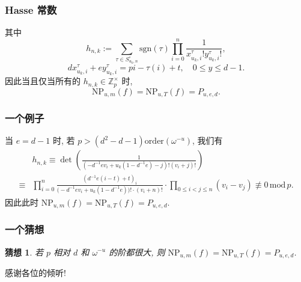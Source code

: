 \documentclass{beamer}
\newcommand\BZ{{\mathbb{Z}}}
\renewcommand\mod{\, \mathrm{mod}\, }
\newcommand\NP{{\mathrm{NP}}}
\newcommand\sgn{{\mathrm{sgn}}}
\newtheorem{conjecture}{猜想}[section]
\begin{document}
\begin{frame}
\frametitle{Hasse 常数}
其中
	\[
	h_{n,k}:=\sum_{\tau\in S_{u_k,n}^\circ}\sgn(\tau)\prod_{i=0}^n\frac{1}{x_{u_k,i}^\tau!y_{u_k,i}^\tau!},
	\]
	\[dx_{u_k,i}^\tau+ey_{u_k,i}^\tau=pi-\tau(i)+t,\quad 0\le y\le d-1.\]
因此当且仅当所有的 $h_{n,k}\in\BZ_p^\times$ 时,
	\[\NP_{u,m}(f)=\NP_{u,T}(f)=P_{u,e,d}.\]
\end{frame}


\begin{frame}
\frametitle{一个例子}
当 $e=d-1$ 时, 若 $p>(d^2-d-1)\mathrm{order}(\omega^{-u})$, 我们有
	\[\begin{split}
	&h_{n,k}\equiv\det\left(\frac{1}{(-d^{-1}ev_i+u_k(1-d^{-1}e)-j)!(v_i+j)!}\right)\\
\equiv &\prod_{i=0}^n \frac{\left(d^{-1}e(i-t)+t\right)_i}{\bigl(-d^{-1}ev_i+u_k(1-d^{-1}e)\bigr)!\cdot(v_i+n)!} \cdot \prod_{0\le i<j\le n}(v_i-v_j)\not\equiv 0\mod p.
\end{split}\]
因此此时 $\NP_{u,m}(f)=\NP_{u,T}(f)=P_{u,e,d}.$
\end{frame}


\begin{frame}
\frametitle{一个猜想}
\begin{conjecture}
若 $p$ 相对 $d$ 和 $\omega^{-u}$ 的阶都很大, 则 $\NP_{u,m}(f)=\NP_{u,T}(f)=P_{u,e,d}$.
\end{conjecture}
\end{frame}

\begin{frame}
\begin{center}
\huge 感谢各位的倾听!
\end{center}
\end{frame}
\end{document}
